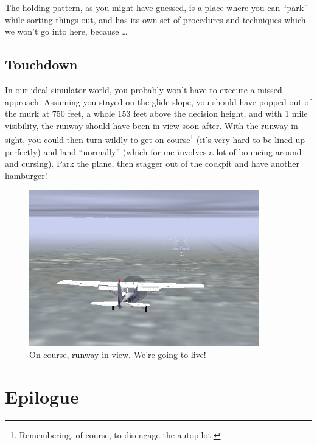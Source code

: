 The holding pattern, as you might have guessed, is a place where you
can ``park'' while sorting things out, and has its own set of
procedures and techniques which we won't go into here, because
\ldots{}

\subsection{Touchdown}

In our ideal simulator world, you probably won't have to execute a
missed approach.  Assuming you stayed on the glide slope, you should
have popped out of the murk at 750 feet, a whole 153 feet above the
decision height, and with 1 mile visibility, the runway should have
been in view soon after.  With the runway in sight, you
could then turn wildly to get on course\footnote{Remembering, of
  course, to disengage the autopilot.}  (it's very hard to be lined up
perfectly) and land ``normally'' (which for me involves a lot of
bouncing around and cursing).
Park the plane, then stagger out of the cockpit and have another
hamburger!

\begin{figure}
  \begin{center}
    \includegraphics[width=10cm]{img/DH_plane_clipped}
    \caption{On course, runway in view.  We're going to live!}
    \label{fig:DH_plane_clipped}
  \end{center}
\end{figure}


\section{Epilogue}

